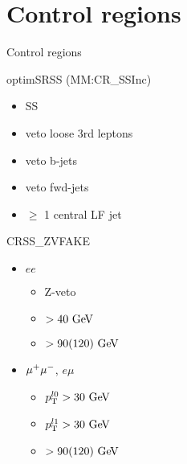 \documentclass[10pt]{beamer}
\begin{document}
\section{Control regions}
\begin{frame}{Control regions}

  \begin{block}{optimSRSS (MM:CR\_SSInc)}
    \begin{itemize}
    \item SS
    \item veto loose 3rd leptons
    \item veto b-jets
    \item veto fwd-jets
    \item $\ge$ 1 central LF jet      
    \end{itemize}
  \end{block}

  \begin{block}{CRSS\_ZVFAKE}
    \begin{itemize}    
    \item $ee$
      \begin{itemize}
      \item Z-veto
      \item \METrel$>40 \GeV$
      \item \mljj$>90(120)\GeV$
      \end{itemize}
    \item $\mathrm{\mu^+ \mu^-}$, $e\mu$
      \begin{itemize}
      \item $\pT^{l0}>30\GeV$
      \item $\pT^{l1}>30\GeV$
      \item \mljj$>90(120)\GeV$
      \end{itemize}
    \end{itemize}
  \end{block}

\end{frame}
\end{document}
